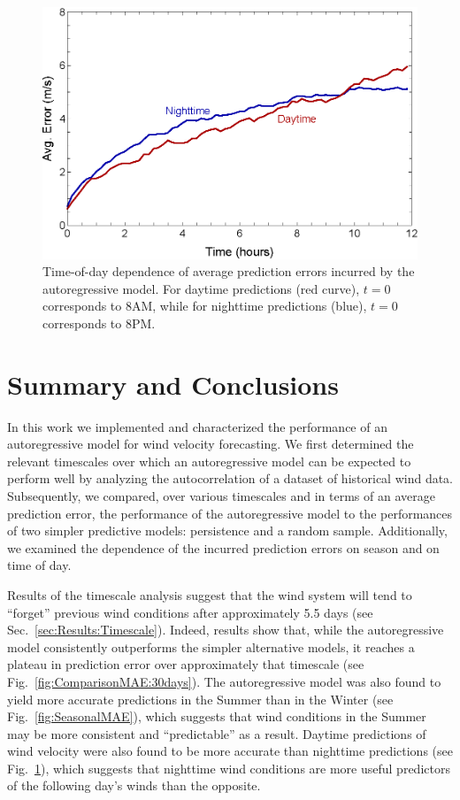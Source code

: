 \documentclass[11pt, oneside]{article}
\newcommand{\figref}[1]{Fig.~\ref{#1}}
\newcommand{\secref}[1]{Sec.~\ref{#1}}
\begin{document}
\begin{figure}[htb]
\centering
\includegraphics[width=0.7\columnwidth]{figures/DiurnalAvgPredictionError}
\caption{Time-of-day dependence of average prediction errors incurred by the autoregressive model.
For daytime predictions (red curve), $t = 0$ corresponds to 8AM, while for nighttime predictions (blue), $t = 0$ corresponds to 8PM.}
\label{fig:DiurnalMAE}
\end{figure}

\section{Summary and Conclusions}\label{sec:Conclusions}
In this work we implemented and characterized the performance of an autoregressive model for wind velocity forecasting.
We first determined the relevant timescales over which an autoregressive model can be expected to perform well by analyzing the autocorrelation of a dataset of historical wind data.
Subsequently, we compared, over various timescales and in terms of an average prediction error, the performance of the autoregressive model to the performances of two simpler predictive models: persistence and a random sample.
Additionally, we examined the dependence of the incurred prediction errors on season and on time of day.

Results of the timescale analysis suggest that the wind system will tend to ``forget'' previous wind conditions after approximately 5.5 days (see \secref{sec:Results:Timescale}).
Indeed, results show that, while the autoregressive model consistently outperforms the simpler alternative models, it reaches a plateau in prediction error over approximately that timescale (see \figref{fig:ComparisonMAE:30days}).
The autoregressive model was also found to yield more accurate predictions in the Summer than in the Winter (see \figref{fig:SeasonalMAE}), which suggests that wind conditions in the Summer may be more consistent and ``predictable'' as a result.
Daytime predictions of wind velocity were also found to be more accurate than nighttime predictions (see \figref{fig:DiurnalMAE}), which suggests that nighttime wind conditions are more useful predictors of the following day's winds than the opposite.
\end{document}
